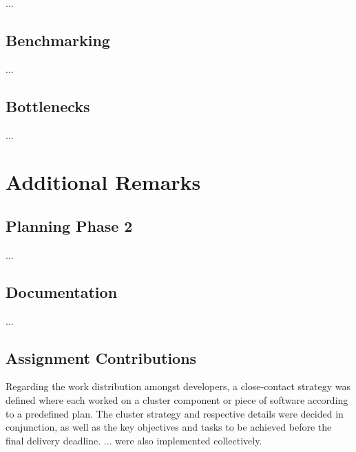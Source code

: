 \documentclass[12pt]{article}
\begin{document}

...

\subsection{Benchmarking} \label{performance.benchmarking} %


...

\subsection{Bottlenecks} \label{performance.bottlenecks} %


...

\newpage
\section{Additional Remarks} \label{remarks} %

\subsection{Planning Phase 2} \label{remarks.planning} %


...

\subsection{Documentation} \label{remarks.documentation} %


...

\subsection{Assignment Contributions} \label{remarks.contributions} %


Regarding the work distribution amongst developers, a close-contact strategy was defined where each worked on a cluster component or piece of software according 
to a predefined plan. 
The cluster strategy and respective details were decided in conjunction, as well as the key objectives and tasks to be achieved before the final delivery deadline.
... were also implemented collectively.
\end{document}
